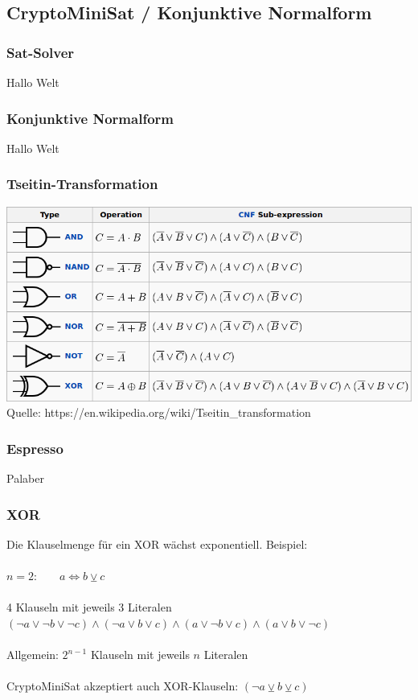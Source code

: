 \documentclass{beamer}
\begin{document}
  \subsection{CryptoMiniSat / Konjunktive Normalform}
    \begin{frame}
      \frametitle{Sat-Solver}
      Hallo Welt
    \end{frame}
    \begin{frame}
      \frametitle{Konjunktive Normalform}
      Hallo Welt
    \end{frame}
    \begin{frame}
      \frametitle{Tseitin-Transformation}
      \includegraphics[scale=1]{tseitin.png}\\
      Quelle: https://en.wikipedia.org/wiki/Tseitin\_transformation
    \end{frame}
    \begin{frame}
      \frametitle{Espresso}
      Palaber
    \end{frame}
    \begin{frame}
      \frametitle{XOR}
      Die Klauselmenge für ein XOR wächst exponentiell. Beispiel:\\
      ~\\
      $n = 2$:~~~~$ a \Leftrightarrow b \veebar c$\\
      ~\\
      4 Klauseln mit jeweils 3 Literalen
      ~\\
      $ (\neg a \vee \neg b \vee \neg c) \wedge (\neg a \vee b \vee c) \wedge (a \vee \neg b \vee c) \wedge (a \vee b \vee \neg c) $\\
      ~\\
      Allgemein: $ 2^{n - 1} $ Klauseln mit jeweils $ n $ Literalen\\
      ~\\
      CryptoMiniSat akzeptiert auch XOR-Klauseln: $ (\neg a \veebar b \veebar c)$\\
    \end{frame}
\end{document}
